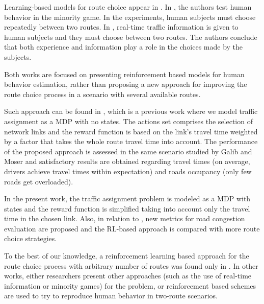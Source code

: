 \documentclass{RITA}
\begin{document}

Learning-based models for route choice appear in \cite{Chmura&Pitz2007,Ben-Elia&Shiftan2010}. In \cite{Chmura&Pitz2007}, the authors test human behavior in the minority game. In the experiments, human subjects must choose repeatedly between two routes. In \cite{Ben-Elia&Shiftan2010}, real-time traffic information is given to human subjects and they must choose between two routes. The authors conclude that both experience and information play a role in the choices made by the subjects.

Both works are focused on presenting reinforcement based models for human behavior estimation, rather than proposing a new approach for improving the route choice process in a scenario with several available routes. 

Such approach can be found in \cite{Tavares&Bazzan2012}, which is a previous work where we model traffic assignment as a MDP with no states. The actions set comprises the selection of network links and the reward function is based on the link's travel time weighted by a factor that takes the whole route travel time into account. The performance of the proposed approach is assessed in the same scenario studied by Galib and Moser \cite{Galib&Moser2011} and satisfactory results are obtained regarding travel times (on average, drivers achieve travel times within expectation) and roads occupancy (only few roads get overloaded). 

In the present work, the traffic assignment problem is modeled as a MDP with states and the reward function is simplified taking into account only the travel time in the chosen link. Also, in relation to \cite{Tavares&Bazzan2012}, new metrics for road congestion evaluation are proposed and the RL-based approach is compared with more route choice strategies. %

To the best of our knowledge, a reinforcement learning based approach for the route choice process with arbitrary number of routes was found only in \cite{Tavares&Bazzan2012}. In other works, either researchers present other approaches (such as the use of real-time information or minority games) for the problem, or reinforcement based schemes are used to try to reproduce human behavior in two-route scenarios.
\end{document}
